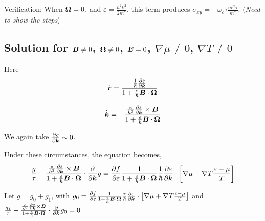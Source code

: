 \documentclass{report}
\renewcommand\vec[1]{\ensuremath\boldsymbol{#1}} %
\begin{document}
Verification: When $\vec{\Omega} = 0$, and $\varepsilon = \frac{\hbar^2 k^2}{2 m^*}$, this term produces $\sigma_{xy} = -\omega_c \tau \frac{n e^2 \tau}{m^*}$.
(\textit{Need to show the steps})

\subsection{Solution for $\vec{B}\neq0$, $\vec{\Omega}\neq 0$, $\vec{E} = 0$, $\nabla \mu \neq 0$, $\nabla T \neq 0$}

Here \begin{equation}
\dot{\vec{r}} = \frac{\frac{1}{\hbar} \frac{\partial \varepsilon}{\partial \vec{k}}}{1 + \frac{e}{\hbar} \vec{B}\cdot\vec{\Omega}}
\end{equation}

\begin{equation}
\dot{\vec{k}} = -\frac{\frac{e}{\hbar^2} \frac{\partial \varepsilon}{\partial \vec{k}} \times \vec{B}}{1 + \frac{e}{\hbar} \vec{B}\cdot\vec{\Omega}}
\end{equation}

We again take $\frac{\partial g}{\partial \vec{k}} \sim 0$.

Under these circumstances, the equation becomes,
$$
\frac{g}{\tau} -\frac{\frac{e}{\hbar^2} \frac{\partial \varepsilon}{\partial \vec{k}} \times \vec{B}}{1 + \frac{e}{\hbar} \vec{B}\cdot\vec{\Omega}} \cdot\frac{\partial}{\partial \vec{k}} g = \frac{\partial f}{\partial \varepsilon}\frac{1}{1 + \frac{e}{\hbar} \vec{B}\cdot\vec{\Omega}}
\frac{1}{\hbar} \frac{\partial \varepsilon}{\partial \vec{k}}\cdot\left[ \nabla{\mu} + \nabla T \frac{\varepsilon - \mu}{T}\right] $$

Let $g = g_0 + g_1$, with $g_0 = \frac{\partial f}{\partial \varepsilon}\frac{1}{1 + \frac{e}{\hbar} \vec{B}\cdot\vec{\Omega}}
\frac{\tau}{\hbar} \frac{\partial \varepsilon}{\partial \vec{k}}\cdot\left[ \nabla{\mu} + \nabla T \frac{\varepsilon - \mu}{T}\right]$ and $\frac{g_1}{\tau} -\frac{\frac{e}{\hbar^2} \frac{\partial \varepsilon}{\partial \vec{k}} \times \vec{B}}{1 + \frac{e}{\hbar} \vec{B}\cdot\vec{\Omega}} \cdot\frac{\partial}{\partial \vec{k}} g_0 = 0$
\end{document}
